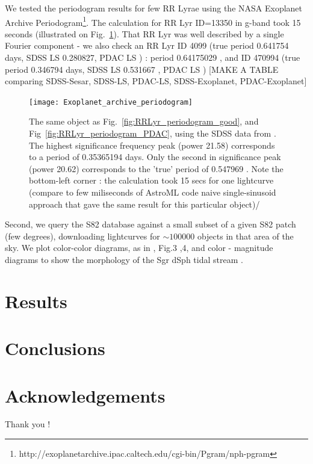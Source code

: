 \documentclass[fleqn,usenatbib]{mnras} %
\begin{document}
We tested the periodogram results for few RR Lyrae using the NASA Exoplanet Archive Periodogram\footnote{http://exoplanetarchive.ipac.caltech.edu/cgi-bin/Pgram/nph-pgram}. The calculation for RR Lyr ID=13350  in g-band took 15 seconds (illustrated on Fig.~\ref{fig:exoplanet_archive}). That RR Lyr was well described by a single Fourier component - we also check an RR Lyr ID 4099 (true period 0.641754 days, SDSS LS 0.280827, PDAC LS  ) : period 0.64175029 , and ID  470994 (true period 0.346794 days, SDSS LS 0.531667 , PDAC LS )
[MAKE A TABLE comparing SDSS-Sesar, SDSS-LS, PDAC-LS,  SDSS-Exoplanet, PDAC-Exoplanet] 

\begin{figure}
\texttt{[image: Exoplanet\_archive\_periodogram]}
\caption{ The same object as Fig.~\ref{fig:RRLyr_periodogram_good}, and Fig~\ref{fig:RRLyr_periodogram_PDAC},  using  the SDSS data from \citep{sesar2010}.  The highest significance frequency peak (power 21.58) corresponds to  a period of 0.35365194 days. Only the second in significance peak (power 20.62) corresponds to the 'true' period of 0.547969 \citep{sesar2010}. Note the bottom-left corner : the calculation took 15 secs for one lightcurve (compare to few miliseconds of AstroML code naive single-sinusoid approach that gave the same result for this particular object)/  }
\label{fig:exoplanet_archive}
\end{figure}



Second, we query the S82 database against a small subset of a given S82 patch (few degrees), downloading lightcurves for $\sim100 000 $ objects in that area of the sky. We plot color-color diagrams, as in \cite{sesar2007}, Fig.3 ,4, and color - magnitude diagrams to show the morphology of the Sgr dSph tidal stream \citep{sesar2010}.  





\section{Results}

\section{Conclusions}

\section*{Acknowledgements}
Thank you ! 
\end{document}
